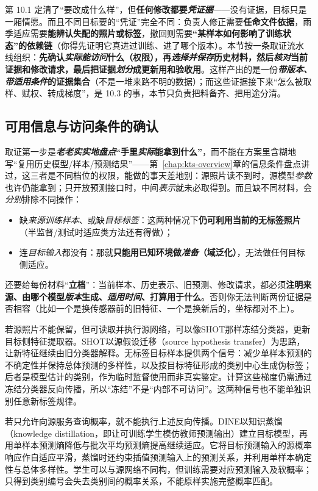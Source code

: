 第 10.1 定清了“要改成什么样”，但\textbf{任何修改都要\emph{凭证据}}——没有证据，目标只是一厢情愿。而且不同目标要的“凭证”完全不同：负责人修正需要\textbf{任命文件依据}，雨季适应需要\textbf{能辨认失配的照片或标签}，撤回则需要\textbf{“某样本如何影响了训练状态”的依赖链}（你得先证明它真进过训练、进了哪个版本）。本节按一条取证流水线组织：\textbf{先确认\emph{实际能访问}什么（权限），再\emph{选择并保存}历史材料，然后\emph{核对}当前证据和修改请求，最后把证据\emph{划分}成更新用和验收用}。这样产出的是一份\textbf{\emph{带版本、带适用条件}的证据集合}（不是一堆来路不明的数据）；而这些证据接下来“怎么被取样、赋权、转成梯度”，是 10.3 的事，本节只负责把料备齐、把用途分清。

\subsection{可用信息与访问条件的确认}
\label{sec:ket-update-access}

取证第一步是\textbf{\emph{老老实实地盘点}“手里\emph{实际}能拿到什么”}，而不能在方案里含糊地写“复用历史模型/样本/预测结果”——第~\ref{chap:kts-overview}章的信息条件盘点讲过，这三者是不同档位的权限，能做的事天差地别：源照片读不到时，源模型\emph{参数}也许仍能拿到；只开放预测接口时，中间\emph{表示}就未必取得到。而且缺不同材料，会\emph{分别}排除不同操作：
\begin{itemize}\item 缺\emph{来源训练样本}、或缺\emph{目标标签}：这两种情况下\textbf{仍可利用当前的无标签照片}（半监督/测试时适应类方法还有得做）；\item 连\emph{目标输入}都没有：那就\textbf{只能用已知环境做\emph{准备}（域泛化）}，无法做任何目标侧适应。\end{itemize}
还要给每份材料“\textbf{立档}”：当前样本、历史表示、旧预测、修改请求，都必须\textbf{注明来源、由哪个模型\emph{版本}生成、\emph{适用时间}、打算用于什么}。否则你无法判断两份证据是否相容（比如一个是换传感器前的旧特征、一个是换新后的，坐标都对不上）。

若源照片不能保留，但可读取并执行源网络，可以像SHOT那样冻结分类器，更新目标侧特征提取器。SHOT以源假设迁移（source hypothesis transfer）为思路，让新特征继续由旧分类器解释。无标签目标样本提供两个信号：减少单样本预测的不确定性并保持总体预测的多样性，以及按目标特征形成的类别中心生成伪标签；后者是模型估计的类别，作为临时监督使用而非真实鉴定。计算这些梯度仍需通过冻结分类器反向传播，所以“冻结”不是“内部不可访问”。这两种信号也不能单独识别任意新标签规律。

若只允许向源服务查询概率，就不能执行上述反向传播。DINE以知识蒸馏（knowledge distillation，即让可训练学生模仿教师预测输出）建立目标模型，再用单样本预测熵降低与批次平均预测熵提高继续适应。它将目标预测输入的源概率响应作自适应平滑，蒸馏时还约束插值预测输入上的预测关系，并利用单样本确定性与总体多样性。学生可以与源网络不同构，但训练需要对应预测输入及软概率；只得到类别编号会失去类别间的概率关系，不能原样实施完整概率匹配。

